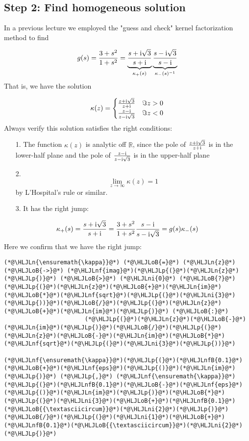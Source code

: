 \documentclass[12pt,a4paper]{article}
\newcommand{\HLJLn}[1]{#1}
\newcommand{\HLJLnf}[1]{\textcolor[RGB]{66,102,213}{#1}}
\newcommand{\HLJLnfB}[1]{\textcolor[RGB]{59,151,46}{#1}}
\newcommand{\HLJLni}[1]{\textcolor[RGB]{59,151,46}{#1}}
\newcommand{\HLJLoB}[1]{\textcolor[RGB]{102,102,102}{\textbf{#1}}}
\newcommand{\HLJLp}[1]{#1}
\def\I{ {\rm i} }
\def\R{ {\mathbb R} }
\begin{document}
\subsection{Step 2: Find homogeneous solution}
In a previous lecture we employed the "guess and check" kernel factorization method to find

\[
g(s) = {3 + s^2 \over 1 + s^2} = \underbrace{s + \I \sqrt{3} \over s + \I}_{\kappa_+(s)}
\underbrace{s - \I \sqrt{3} \over s-\I }_{\kappa_-(s)^{-1}}
\]
That is, we have the solution

\[
\kappa(z) = \begin{cases} {z + \I \sqrt{3} \over z + \I}  & \Im z > 0 \\
                            {z - \I  \over z - \I \sqrt{3}} & \Im z < 0
                            \end{cases}
\]
Always verify this solution satisfies the right conditions:

\begin{itemize}
\item[1. ] The function $\kappa(z)$ is analytic off $\R$, since the pole of ${z + \I \sqrt{3} \over z + \I}$ is in the lower-half plane and the pole of ${z - \I  \over z - \I \sqrt{3}}$ is in the upper-half plane


\item[2. ] \[
\lim_{z \to \infty} \kappa(z) = 1
\]
by L'Hospital's rule or similar.


\item[3. ] It has the right jump:

\end{itemize}
\[
\kappa_+(s) = {s + \I \sqrt{3} \over s + \I} = {3 + s^2 \over 1 + s^2}{s - \I  \over s - \I \sqrt{3}} = g(s)\kappa_-(s)
\]
Here we confirm that we have the right jump:


\begin{lstlisting}
(*@\HLJLn{\ensuremath{\kappa}}@*) (*@\HLJLoB{=}@*) (*@\HLJLn{z}@*) (*@\HLJLoB{->}@*) (*@\HLJLnf{imag}@*)(*@\HLJLp{(}@*)(*@\HLJLn{z}@*)(*@\HLJLp{)}@*) (*@\HLJLoB{>}@*) (*@\HLJLni{0}@*) (*@\HLJLoB{?}@*) (*@\HLJLp{(}@*)(*@\HLJLn{z}@*)(*@\HLJLoB{+}@*)(*@\HLJLn{im}@*)(*@\HLJLoB{*}@*)(*@\HLJLnf{sqrt}@*)(*@\HLJLp{(}@*)(*@\HLJLni{3}@*)(*@\HLJLp{))}@*)(*@\HLJLoB{/}@*)(*@\HLJLp{(}@*)(*@\HLJLn{z}@*)(*@\HLJLoB{+}@*)(*@\HLJLn{im}@*)(*@\HLJLp{)}@*) (*@\HLJLoB{:}@*)
                       (*@\HLJLp{(}@*)(*@\HLJLn{z}@*)(*@\HLJLoB{-}@*)(*@\HLJLn{im}@*)(*@\HLJLp{)}@*)(*@\HLJLoB{/}@*)(*@\HLJLp{(}@*)(*@\HLJLn{z}@*)(*@\HLJLoB{-}@*)(*@\HLJLn{im}@*)(*@\HLJLoB{*}@*)(*@\HLJLnf{sqrt}@*)(*@\HLJLp{(}@*)(*@\HLJLni{3}@*)(*@\HLJLp{))}@*)

(*@\HLJLnf{\ensuremath{\kappa}}@*)(*@\HLJLp{(}@*)(*@\HLJLnfB{0.1}@*)(*@\HLJLoB{+}@*)(*@\HLJLnf{eps}@*)(*@\HLJLp{()}@*)(*@\HLJLn{im}@*)(*@\HLJLp{)}@*) (*@\HLJLp{,}@*) (*@\HLJLnf{\ensuremath{\kappa}}@*)(*@\HLJLp{(}@*)(*@\HLJLnfB{0.1}@*)(*@\HLJLoB{-}@*)(*@\HLJLnf{eps}@*)(*@\HLJLp{()}@*)(*@\HLJLn{im}@*)(*@\HLJLp{)}@*)(*@\HLJLoB{*}@*)(*@\HLJLp{(}@*)(*@\HLJLni{3}@*)(*@\HLJLoB{+}@*)(*@\HLJLnfB{0.1}@*)(*@\HLJLoB{{\textasciicircum}}@*)(*@\HLJLni{2}@*)(*@\HLJLp{)}@*)(*@\HLJLoB{/}@*)(*@\HLJLp{(}@*)(*@\HLJLni{1}@*)(*@\HLJLoB{+}@*)(*@\HLJLnfB{0.1}@*)(*@\HLJLoB{{\textasciicircum}}@*)(*@\HLJLni{2}@*)(*@\HLJLp{)}@*)
\end{lstlisting}
\end{document}
